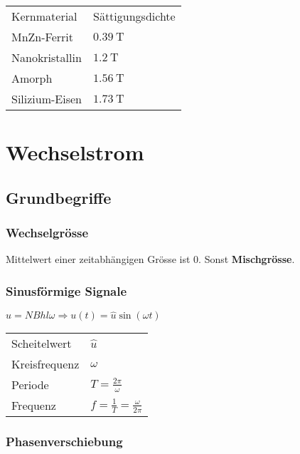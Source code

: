 \documentclass[10pt,a4paper]{scrartcl}
\begin{document}
\begin{multicols*}{3}
	\begin{tabular}{ll}
	Kernmaterial&Sättigungsdichte\\
	MnZn-Ferrit&$\SI{0.39}{\tesla}$\\
	Nanokristallin&$\SI{1.2}{\tesla}$\\
	Amorph&$\SI{1.56}{\tesla}$\\
	Silizium-Eisen&$\SI{1.73}{\tesla}$
	\end{tabular}
	
	\finn
	
	 
	
	\section{Wechselstrom}
	
	\subsection{Grundbegriffe}
	
	\subsubsection{Wechselgrösse}
	
	Mittelwert einer zeitabhängigen Grösse ist 0. Sonst \textbf{Mischgrösse}.
	
	\columnbreak 
	
	\subsubsection{Sinusförmige Signale}
	
	
	$\hat{u}=NBhl\omega\Rightarrow u(t)=\hat{u}\sin(\omega t)$
	
	\footnotesize
	\begin{tabular}{ll}
	Scheitelwert & $\hat{u}$\\
	Kreisfrequenz & $\omega$\\
	Periode & $T=\frac{2\pi}{\omega}$\\
	Frequenz & $f=\frac{1}{T}=\frac{\omega}{2\pi}$
	\end{tabular}
	\normalsize
	
	\finn
	
	 
	
	\subsubsection{Phasenverschiebung}
	

\end{multicols*}
\end{document}
